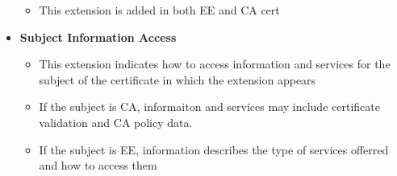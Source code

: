 \documentclass[12pt]{report}
\begin{document}
\begin{itemize}
\begin{itemize}
                    \item This extension is added in both EE and  CA cert
                \end{itemize}
            \item \textbf{Subject Information Access}
                \begin{itemize}
                    \item This extension indicates how to access information and services for the subject of the certificate in which the extension appears
                    \item If the subject is CA, informaiton and services may include certificate validation and CA policy data. 
                    \item If the subject is EE, information describes the type of services offerred and how to access them
                \end{itemize}
        \end{itemize}
\end{document}
